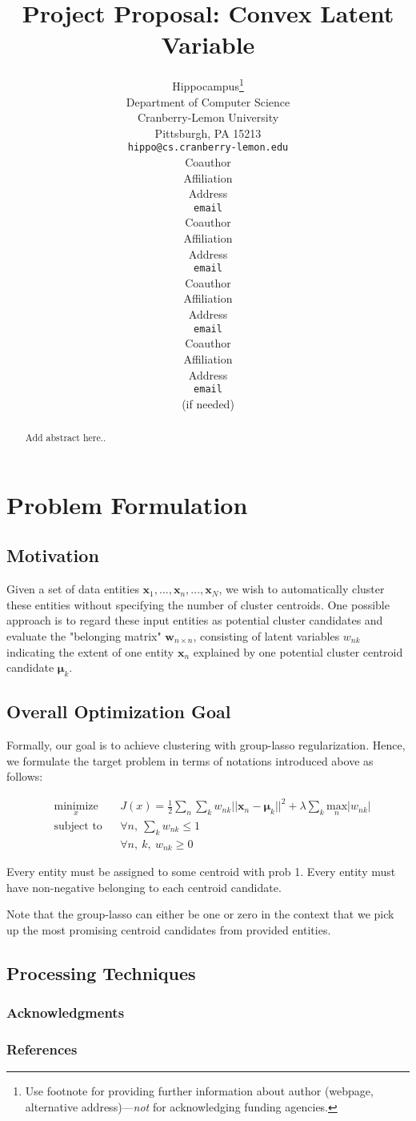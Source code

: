 \documentclass{article} %
\title{Project Proposal: Convex Latent Variable}
\author{
Hippocampus\thanks{ Use footnote for providing further information
about author (webpage, alternative address)---\emph{not} for acknowledging
funding agencies.} \\
Department of Computer Science\\
Cranberry-Lemon University\\
Pittsburgh, PA 15213 \\
\texttt{hippo@cs.cranberry-lemon.edu} \\
\And
Coauthor \\
Affiliation \\
Address \\
\texttt{email} \\
\AND
Coauthor \\
Affiliation \\
Address \\
\texttt{email} \\
\And
Coauthor \\
Affiliation \\
Address \\
\texttt{email} \\
\And
Coauthor \\
Affiliation \\
Address \\
\texttt{email} \\
(if needed)\\
}
\newcommand{\sumn}{\sum_{n}}
\newcommand{\sumk}{\sum_{k}}
\newcommand{\wnk}{w_{nk}}
\newcommand{\wnbyn}{\mathbf{w}_{n\times n}}
\newcommand{\x}[1]{\mathbf{x}_{#1}}
\newcommand{\xn}{\mathbf{x}_n}
\newcommand{\muk}{\boldsymbol{\mu}_k}
\newcommand{\LTwoNorm}[1]{||#1||^{2}}
\newcommand{\maxn}{ \underset{n}{\text{max}} }
\begin{document}
\maketitle

\begin{abstract}
    Add abstract here..
\end{abstract}

\section{Problem Formulation}
\subsection{Motivation}
Given a set of data entities $\x{1}, ..., \xn, ..., \x{N} $, we wish to
automatically cluster these entities without specifying the number of cluster
centroids. One possible approach is to regard these input entities as
potential cluster candidates and evaluate the "belonging matrix" $\wnbyn$, consisting
of latent variables $\wnk$ indicating the extent of one entity $\xn$ explained
by one potential cluster centroid candidate $\muk$.


\subsection{Overall Optimization Goal}
Formally, our goal is to achieve clustering with group-lasso regularization.
Hence, we formulate the target problem in terms of notations introduced above
as follows:  

 \begin{align}
 & \underset{x}{\text{minimize}}
 & & 
    J(x) = \frac{1}{2} \sumn \sumk \wnk \LTwoNorm{\xn - \muk}  %
        + \lambda \sumk \maxn | \wnk |  \\ %
 & \text{subject to} 
 & & 
 \forall n,\ \sumk \wnk \leq 1 \\
 & 
 & &
 \forall n,\ k,\ \wnk \geq 0
 \end{align}

Every entity must be assigned to some centroid with prob 1.
Every entity must have non-negative belonging to each centroid candidate.

Note that the group-lasso can either be one or zero in the context that we
pick up the most promising centroid candidates from provided entities. 

\subsection{Processing Techniques}


\subsubsection*{Acknowledgments}

\subsubsection*{References}
\small{

}
\end{document}
